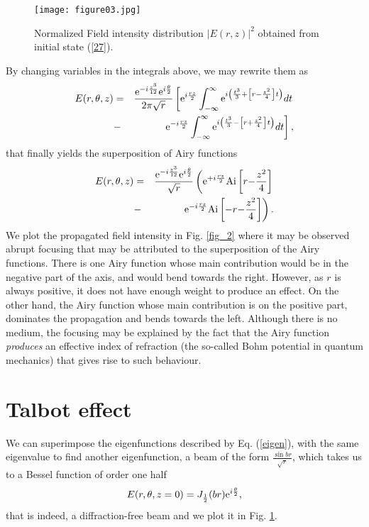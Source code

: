 \documentclass[aps,pra,reprint,superscriptaddress]{revtex4-2}
\begin{document}
\begin{figure}
	\begin{center}
	\texttt{[image: figure03.jpg]} 
		\caption{Normalized Field intensity distribution $\vert E(r,z)\vert^2$ obtained from initial state (\ref{27}).} 
		\label{fig_2.5}
	\end{center}
\end{figure}

By changing variables in the integrals above, we may rewrite them as
%
%
\begin{eqnarray}\nonumber
 E(r,\theta,z)&=&\frac{\hbox{e}^{{\color{black}-}i\frac{z^3}{12}}\hbox{e}^{i\frac{\theta}{2}}}{2\pi\sqrt{r}}\left[\hbox{e}^{i\frac{rz}{2}}\int_{-\infty}^{\infty}\hbox{e}^{i\left(\frac{t^{3}}{3}+\left[r{\color{black}-}\frac{z^2}{4}\right]t\right)}dt\right.\\ &-&\left.\hbox{e}^{{\color{black}-}i\frac{rz}{2}}\int_{-\infty}^{\infty}\hbox{e}^{i\left(\frac{t^{3}}{3}-\left[r{\color{black}+}\frac{z^2}{4}\right]t\right)}dt\right],
\end{eqnarray}
%
%
that finally yields the superposition of Airy functions
%
%
\begin{eqnarray}\nonumber
 E(r,\theta,z)&=&\frac{\hbox{e}^{{\color{black}-}i\frac{z^3}{12}}\hbox{e}^{i\frac{\theta}{2}}}{\sqrt{r}}\left(\hbox{e}^{{\color{black}+}i\frac{rz}{2}}
 \hbox{Ai}\left[r{\color{black}-}\frac{z^2}{4}\right]\right.\\ &-&\left. \hbox{e}^{{\color{black}-}i\frac{rz}{2}}\hbox{Ai}\left[-r{\color{black}-}\frac{z^2}{4}\right]\right).
 \end{eqnarray}
 We plot the propagated field intensity in Fig. \ref{fig_2} where it may be observed  abrupt focusing that may be attributed to the superposition of the Airy functions. There is one Airy function whose main contribution would be in the negative part of the axis, and would bend towards the right. However, as $r$ is always positive, it does not have enough weight to produce an effect. On the other hand, the Airy function whose main contribution is on the positive part, dominates the propagation and bends towards the left. Although there is no medium, the focusing may be explained by the fact that the Airy function {\it produces} an effective index of refraction (the so-called Bohm potential in quantum mechanics) \cite{Asenjo2021,Hojman2021} that gives rise to such behaviour.

\section{Talbot effect}
We can superimpose the eigenfunctions described by Eq. (\ref{eigen}), with the same eigenvalue to find another eigenfunction, a beam of the form $\frac{\sin{br}}{\sqrt{r}}$, which takes us to a Bessel function of order one half
%
%
\begin{equation} \label{27}
   E(r,\theta,z=0)=J_{\frac{1}{2}}(br)\hbox{e}^{i\frac{\theta}{2}},
\end{equation}
%
%
that is indeed, a diffraction-free beam and we plot it  in Fig. \ref{fig_2.5}.
\end{document}
